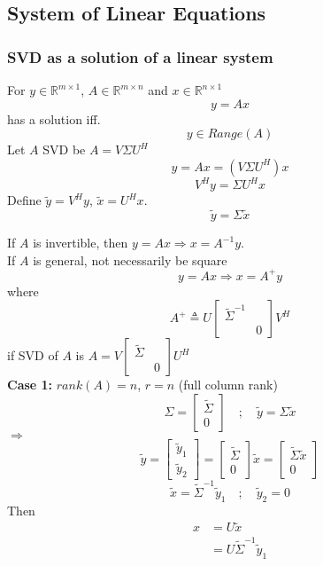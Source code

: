 \begin{multicols}{2}
\subsection{System of Linear Equations}
\subsubsection{SVD as a solution of a linear system}
For $y\in\mathbb{R}^{m\times 1}$, $A\in\mathbb{R}^{m\times n}$ and $x \in\mathbb{R}^{n\times 1}$
\[
    y=Ax
\]
has a solution iff.
\[
    y\in Range(A)
\]
Let $A$ SVD be $A = V\Sigma U^H$
\[
    y=Ax=(V\Sigma U^H)x
\]
\[
    V^Hy=\Sigma U^Hx
\]
Define $\tilde{y}=V^Hy$, $\tilde{x}= U^H x$.
\[
    \tilde{y} = \Sigma \tilde{x}
\]

If $A$ is invertible, then $y=Ax \Longrightarrow x=A^{-1}y$. \\
If $A$ is general, not necessarily be square 
\[y=Ax \Longrightarrow x=A^{+}y\]
where 
\[
    A^{+} \triangleq U\begin{bmatrix}
        \tilde{\Sigma}^{-1} & \\ & 0
    \end{bmatrix} V^H
\]
if SVD of $A$ is $A=V\begin{bmatrix}
    \tilde{\Sigma} & \\ & 0
\end{bmatrix}U^H$ \\
\textbf{Case 1:} $rank(A)=n$, $r=n$ (full column rank)
\[
    \Sigma = \begin{bmatrix}
        \tilde{\Sigma} \\ 0
    \end{bmatrix} \quad ; \quad 
    \tilde{y}=\Sigma \tilde{x}
\]
$\Longrightarrow$
\[
    \tilde{y}=\begin{bmatrix}
        \tilde{y}_1 \\ \tilde{y}_2
    \end{bmatrix}=\begin{bmatrix}
        \tilde{\Sigma} \\ 0
    \end{bmatrix}\tilde{x} = \begin{bmatrix}
        \tilde{\Sigma}\tilde{x} \\ 0
    \end{bmatrix}
\]
\[
    \tilde{x} = \tilde{\Sigma}^{-1}\tilde{y}_1 \quad ; \quad \tilde{y}_2 = 0
\]
Then
\[
    \begin{array}{ll}
        x &= U\tilde{x} \\
        &= U\tilde{\Sigma}^{-1}\tilde{y}_1 \\

\end{array}\]
\end{multicols}

